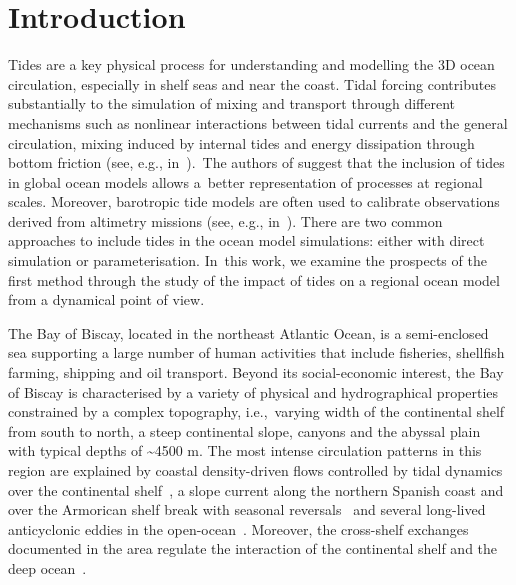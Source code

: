 \documentclass[jmse,article,accept,moreauthors,pdftex]{Definitions/mdpi}
\begin{document}


\section{Introduction}

Tides are a key physical process for understanding and modelling the 3D ocean circulation, especially in shelf seas and near the coast. Tidal forcing contributes substantially to the simulation of mixing and transport through different mechanisms such as nonlinear interactions between tidal currents and the general circulation, mixing induced by internal tides and energy dissipation through bottom friction (see, e.g., in~\cite{Gerkema2004,Guarnieri2013,Suanda2017,Stanev2020}).~The authors of \cite{Holt2017} suggest that the inclusion of tides in global ocean models allows a~better representation of processes at regional scales. Moreover, barotropic tide models are often used to calibrate observations derived from altimetry missions (see, e.g., in~\cite{stammer2014}). There are two common approaches to include tides in the ocean model simulations: either with direct simulation or parameterisation. In~this work, we examine the prospects of the first method through the study of the impact of tides on a regional ocean model from a dynamical point of view.

The Bay of Biscay, located in the northeast Atlantic Ocean, is a semi-enclosed sea supporting a large number of human activities that include fisheries, shellfish farming, shipping and oil transport. Beyond its social-economic interest, the Bay of Biscay is characterised by a variety of physical and hydrographical properties~\cite{koutsikopoulos1996} constrained by a complex topography, i.e.,~varying width of the continental shelf from south to north, a steep continental slope, canyons and the abyssal plain with typical depths of \textasciitilde4500 m. The most intense circulation patterns in this region are explained by coastal density-driven flows controlled by tidal dynamics over the continental shelf~\cite{LECANN1990,Pairaud2008}, a slope current along the northern Spanish coast and over the Armorican shelf break with seasonal reversals~\cite{pingree_lc1990,Garcia-Soto2002,LEBOYER2009} and several long-lived anticyclonic eddies in the open-ocean~\cite{pingree1992a,pingree1992b}. Moreover, the cross-shelf exchanges documented in the area regulate the interaction of the continental shelf and the deep ocean~\cite{REVERDIN2013,PORTER2016,RUBIO2018,Akpnar2020}.
\end{document}
